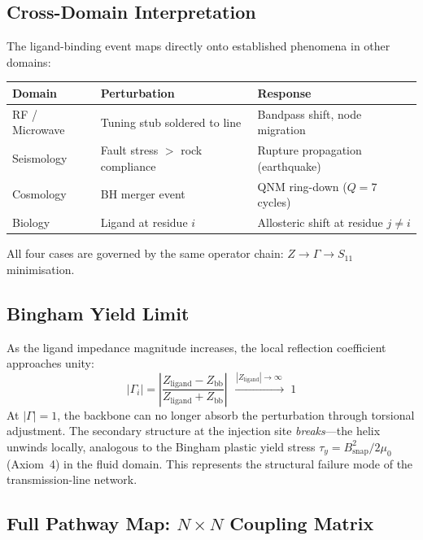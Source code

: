 \subsection{Cross-Domain Interpretation}
\label{sec:allostery_crossdomain}

The ligand-binding event maps directly onto established phenomena in
other domains:

\begin{center}
\small
\begin{tabular}{@{}l l l@{}}
\toprule
\textbf{Domain} & \textbf{Perturbation} & \textbf{Response} \\
\midrule
RF / Microwave  & Tuning stub soldered to line & Bandpass shift, node migration \\
Seismology      & Fault stress $>$ rock compliance & Rupture propagation (earthquake) \\
Cosmology       & BH merger event & QNM ring-down ($Q = 7$ cycles) \\
Biology         & Ligand at residue $i$ & Allosteric shift at residue $j \neq i$ \\
\bottomrule
\end{tabular}
\end{center}

All four cases are governed by the same operator chain:
$Z \to \Gamma \to S_{11}$ minimisation.

\subsection{Bingham Yield Limit}
\label{sec:yield}

As the ligand impedance magnitude increases, the local reflection
coefficient approaches unity:
\begin{equation}
    |\Gamma_i| = \left|\frac{Z_\text{ligand} - Z_\text{bb}}
                            {Z_\text{ligand} + Z_\text{bb}}\right|
    \;\xrightarrow{\;|Z_\text{ligand}| \to \infty\;}\; 1
    \label{eq:gamma_yield}
\end{equation}
At $|\Gamma| = 1$, the backbone can no longer absorb the perturbation
through torsional adjustment.  The secondary structure at the injection
site \emph{breaks}---the helix unwinds locally, analogous to the
Bingham plastic yield stress $\tau_y = B_\text{snap}^2 / 2\mu_0$
(Axiom~4) in the fluid domain.  This represents the structural failure
mode of the transmission-line network.

\subsection{Full Pathway Map: $N \times N$ Coupling Matrix}
\label{sec:pathway_map}

